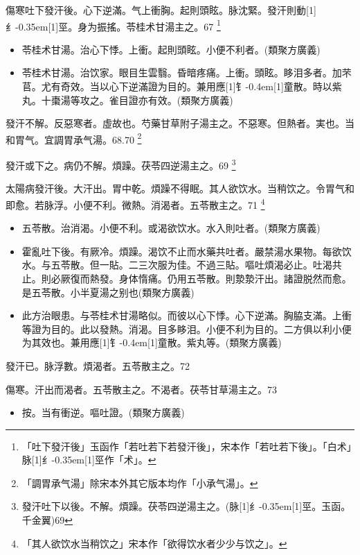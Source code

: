 \documentclass[11pt,oneside,b5paper]{ctexbook}
\begin{document}
\begin{flushleft}
傷寒吐下發汗後。心下逆滿。气上衝胸。起則頭眩。脉沈緊。發汗則動{\hbox{\scalebox{0.68}[1]{纟}\kern-0.35em\scalebox{0.64}[1]{巠}}}。身为振搖。苓桂术甘湯主之。67
\footnote{「吐下發汗後」玉函作「若吐若下若發汗後」，宋本作「若吐若下後」。「白术」脉{\hbox{\scalebox{0.68}[1]{纟}\kern-0.35em\scalebox{0.64}[1]{巠}}}作「术」。}

\begin{itemize}
\item 苓桂术甘湯。治心下悸。上衝。起則頭眩。小便不利者。(類聚方廣義)
\item 苓桂术甘湯。治饮家。眼目生雲翳。昏暗疼痛。上衝。頭眩。眵泪多者。加芣苢。尤有奇效。当以心下逆滿證为目的。兼用應{\hbox{\scalebox{0.7}[1]{钅}\kern-0.4em\scalebox{0.7}[1]{童}}}散。時以紫丸。十棗湯等攻之。雀目證亦有效。(類聚方廣義)
\end{itemize}

發汗不解。反惡寒者。虛故也。芍藥甘草附子湯主之。不惡寒。但熱者。実也。当和胃气。宜調胃承气湯。68.70
\footnote{「調胃承气湯」除宋本外其它版本均作「小承气湯」。}

發汗或下之。病仍不解。煩躁。茯苓四逆湯主之。69
\footnote{發汗吐下以後。不解。煩躁。茯苓四逆湯主之。(脉{\hbox{\scalebox{0.68}[1]{纟}\kern-0.35em\scalebox{0.64}[1]{巠}}}。玉函。千金翼)69}

太陽病發汗後。大汗出。胃中乾。煩躁不得眠。其人欲饮水。当稍饮之。令胃气和即愈。若脉浮。小便不利。微熱。消渴者。五苓散主之。71
\footnote{「其人欲饮水当稍饮之」宋本作「欲得饮水者少少与饮之」。}

\begin{itemize}
\item 五苓散。治消渴。小便不利。或渴欲饮水。水入則吐者。(類聚方廣義)
\item 霍亂吐下後。有厥冷。煩躁。渴饮不止而水藥共吐者。嚴禁湯水果物。每欲饮水。与五苓散。但一貼。二三次服为佳。不過三貼。嘔吐煩渴必止。吐渴共止。則必厥復而熱發。身体惰痛。仍用五苓散。則漐漐汗出。諸證脱然而愈。是五苓散。小半夏湯之别也(類聚方廣義)
\item 此方治眼患。与苓桂术甘湯略似。而彼以心下悸。心下逆滿。胸脇支滿。上衝等證为目的。此以發熱。消渴。目多眵泪。小便不利为目的。二方俱以利小便为其效也。兼用應{\hbox{\scalebox{0.7}[1]{钅}\kern-0.4em\scalebox{0.7}[1]{童}}}散。紫丸等。(類聚方廣義)
\end{itemize}

發汗已。脉浮數。煩渴者。五苓散主之。72

傷寒。汗出而渴者。五苓散主之。不渴者。茯苓甘草湯主之。73

\begin{itemize}
\item 按。当有衝逆。嘔吐證。(類聚方廣義)
\end{itemize}


\end{flushleft}
\end{document}
